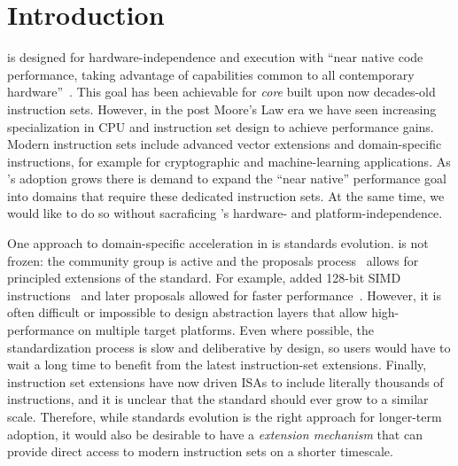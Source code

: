 \section{Introduction}


\wasm is designed for hardware-independence and execution with ``near native
code performance, taking advantage of capabilities common to all contemporary
hardware''~\cite{wasm-spec-core}. This goal has been achievable for \emph{core}
\wasm built upon now decades-old instruction sets. However, in the post Moore's
Law era we have seen increasing specialization in CPU and instruction set design
to achieve performance gains. Modern instruction sets include advanced vector
extensions and domain-specific instructions, for example for cryptographic and
machine-learning applications. As \wasm's adoption grows there is demand to
expand the ``near native'' performance goal into domains that require these
dedicated instruction sets.  At the same time, we would like to do so without
sacraficing \wasm's hardware- and platform-independence.


One approach to domain-specific acceleration in \wasm is standards evolution.
\wasm is not frozen: the community group is active and the proposals
process~\cite{wasm-proposals} allows for principled extensions of the standard.
For example,  added 128-bit SIMD instructions~\cite{wasm-simd} and
later proposals allowed for faster performance~\cite{wasm-relaxed-simd}.
However, it is often difficult or impossible to design abstraction layers that
allow high-performance on multiple target platforms. Even where possible, the
standardization process is slow and deliberative by design, so \wasm users would
have to wait a long time to benefit from the latest instruction-set extensions.
Finally, instruction set extensions have now driven ISAs to include literally
thousands of instructions, and it is unclear that the \wasm standard should ever
grow to a similar scale. Therefore, while standards evolution is the right
approach for longer-term adoption, it would also be desirable to have a
\emph{\wasml extension mechanism} that can provide direct access to modern
instruction sets on a shorter timescale.


